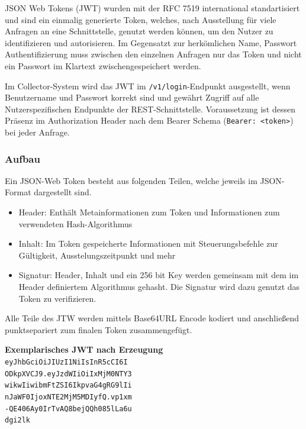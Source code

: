        JSON Web Tokens (JWT) wurden mit der RFC 7519 international standartisiert und sind ein einmalig generierte Token, welches, nach Ausstellung für viele Anfragen an eine Schnittstelle, genutzt werden können, um den Nutzer zu identifizieren und autorisieren. Im Gegensatzt zur herkömlichen Name, Passwort Authentifizierung muss zwischen den einzelnen Anfragen nur das Token und nicht ein Passwort im Klartext zwischengespeichert werden.

        Im Collector-System wird das JWT im \texttt{/v1/login}-Endpunkt ausgestellt, wenn Benutzername und Passwort korrekt sind und gewährt Zugriff auf alle Nutzerspezifischen Endpunkte der REST-Schnittstelle. Voraussetzung ist dessen Präsenz im Authorization Header nach dem Bearer Schema (\texttt{Bearer: <token>}) bei jeder Anfrage.
        
        \subsubsection{Aufbau}
        Ein JSON-Web Token besteht aus folgenden Teilen, welche jeweils im JSON-Format dargestellt sind.
        \begin{itemize}
            \item Header: Enthält Metainformationen zum Token und Informationen zum verwendeten Hash-Algorithmus
            \item Inhalt: Im Token gespeicherte Informationen mit Steuerungsbefehle zur Gültigkeit, Ausstelungszeitpunkt und mehr
            \item Signatur: Header, Inhalt und ein 256 bit Key werden gemeinsam mit dem im Header definiertem Algorithmus gehasht. Die Signatur wird dazu genutzt das Token zu verifizieren.
        \end{itemize}
        
        Alle Teile des JTW werden mittels Base64URL Encode kodiert und anschließend punktsepariert zum finalen Token zusammengefügt.
        
        \begin{center}
            \textbf{Exemplarisches JWT nach Erzeugung} \\
            \texttt{eyJhbGciOiJIUzI1NiIsInR5cCI6I \\
            ODkpXVCJ9.eyJzdWIiOiIxMjM0NTY3 \\
            wikwIiwibmFtZSI6IkpvaG4gRG9lIi \\
            nJaWF0IjoxNTE2MjM5MDIyfQ.vp1xm \\
            -QE406Ay0IrTvAQ8bejQQh085lLa6u \\
            dgi2lk}
        \end{center}
        
